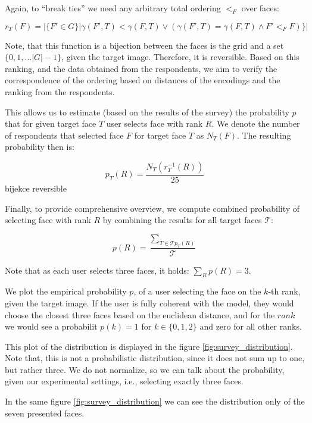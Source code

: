 Again, to ``break ties'' we need any arbitrary total ordering $<_F$ over faces:

$$
 r_T(F) = |\{F'\in G\}| \gamma(F', T) < \gamma(F, T) \lor (\gamma(F', T) = \gamma(F, T) \land F' <_F F)\} |
$$


Note, that this function is a bijection between the faces is the grid and a set $\{0, 1, \ldots |G| - 1\}$, given the target image. Therefore, it is reversible. Based on this ranking, and the data obtained from the respondents, we aim to verify the correspondence of the ordering based on distances of the encodings and the ranking from the respondents.

This allows us to estimate (based on the results of the survey) the probability $p$ that for given target face $T$ user selects face with rank $R$. We denote the number of respondents that selected face $F$ for target face $T$ as $N_T(F)$. The resulting probability then is:

$$
    p_T(R) = \frac{N_T(r_T^{-1}(R))}{25}
$$
bijekce reversible

Finally, to provide comprehensive overview, we compute combined probability of selecting face with rank $R$ by combining the results for all target faces $\mathcal{T}$:

$$
p(R) = \frac{\sum_{T\in \mathcal{T} p_T(R)}}{\mathcal{T}}
$$

Note that as each user selects three faces, it holds: $\sum_R p(R) = 3$.

We plot the empirical probability $p$, of a user selecting the face on the $k$-th rank, given the target image. If the user is fully coherent with the model, they would choose the closest three faces based on the euclidean distance, and for the $rank$ we would see a probabilit $p(k) = 1$ for $k\in\{0,1, 2\}$ and zero for all other ranks. 

This plot of the distribution is displayed in the figure \ref{fig:survey_distribution}. Note that, this is not a probabilistic distribution, since it does not sum up to one, but rather three. We do not normalize, so we can talk about the probability, given our experimental settings, i.e., selecting exactly three faces.

In the same figure \ref{fig:survey_distribution} we can see the distribution only of the seven presented faces.

